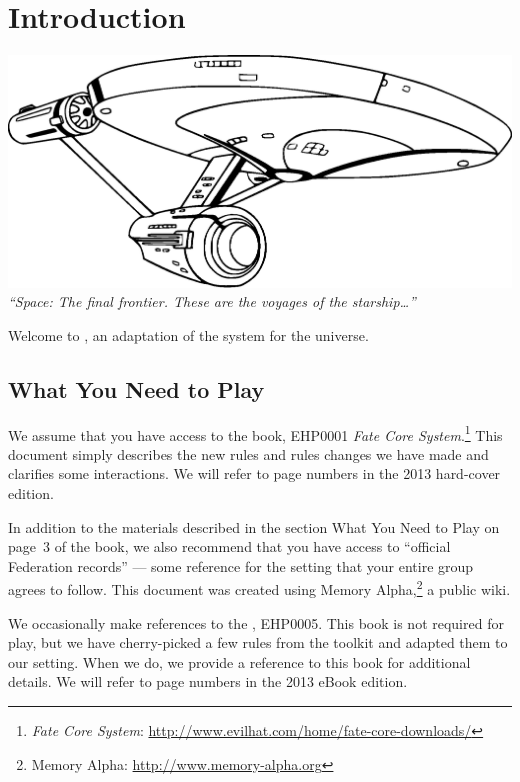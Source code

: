 \documentclass[12pt,titlepage,openany]{book}
\begin{document}
\mainmatter



\chapter{Introduction}\label{chap:intro}

\begin{center}
    \includegraphics[width=0.6\linewidth]{img/Enterprise.eps}\\
    \vspace{2ex}
    \textit{``Space: The final frontier. These are the voyages of the
    starship\ldots''}
\end{center}

\vspace{1em}

\noindent
Welcome to \StarTrekFate{}, an adaptation of the \FateCore{} system for the
\StarTrek{} universe.

\section{What You Need to Play}\label{sec:to-play}
We assume that you have access to the \FateCore{} book, EHP0001 \textit{Fate
Core System}.\footnote{\textit{Fate Core System}:
\url{http://www.evilhat.com/home/fate-core-downloads/}} This document simply
describes the new rules and rules changes we have made and clarifies some
interactions. We will refer to page numbers in the 2013 hard-cover edition.

In addition to the materials described in the section What You Need to Play on
page~3 of the \FateCore{} book, we also recommend that you have access to
``official Federation records'' --- some reference for the \StarTrek{} setting
that your entire group agrees to follow. This document was created using Memory
Alpha,\footnote{Memory Alpha: \url{http://www.memory-alpha.org}} a public
\StarTrek{} wiki.

We occasionally make references to the \FateSystemToolkit{}, EHP0005. This book
is not required for play, but we have cherry-picked a few rules from the
toolkit and adapted them to our setting. When we do, we provide a reference to
this book for additional details. We will refer to page numbers in the 2013
eBook edition.
\end{document}
